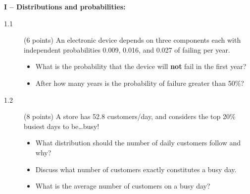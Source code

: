 \documentclass[11pt]{article}
\begin{document}
\vspace{4ex}
\noindent
{\bf I -- Distributions and probabilities:}
\vspace*{-1ex}
\begin{description}
  \item[1.1] (6 points)
    An electronic device depends on three components each with independent probabilities 0.009, 0.016, and 0.027 of
    failing per year.
  \vspace*{-1ex}
  \begin{itemize}
    \item What is the probability that the device will {\bf not} fail in the first year?
    \item After how many years is the probability of failure greater than 50\%?
  \end{itemize}
%
  \item[1.2] (8 points)
  A store has 52.8 customers/day, and considers the top 20\% busiest days to be\ldots busy!
  \vspace*{-1ex}
  \begin{itemize}
    \item What distribution should the number of daily customers follow and why?
    \item Discuss what number of customers exactly constitutes a busy day.
    \item What is the average number of customers on a busy day?
  \end{itemize}
\end{description}





\end{document}
